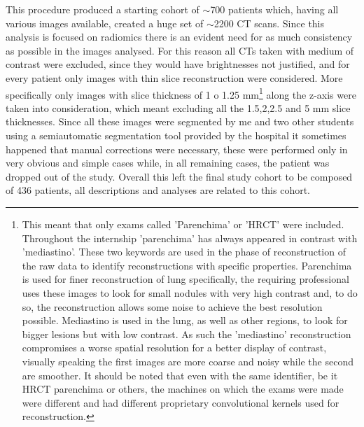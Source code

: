 This procedure produced a starting cohort of $\sim$700 patients which, having all various images available, created a huge set of $\sim$2200 CT scans. Since this analysis is focused on radiomics there is an evident need for as much consistency as possible in the images analysed. For this reason all CTs taken with medium of contrast were excluded, since they would have brightnesses not justified, and for every patient only images with thin slice reconstruction were considered. More specifically only images with slice thickness of 1 o 1.25 mm\footnote{This meant that only exams called 'Parenchima' or  'HRCT' were included. Throughout the internship 'parenchima' has always appeared in contrast with 'mediastino'. These two keywords are used in the phase of reconstruction of the raw data to identify reconstructions with specific properties. Parenchima is used for finer reconstruction of lung specifically, the requiring professional uses these images to look for small nodules with very high contrast and, to do so, the reconstruction allows some noise to achieve the best resolution possible. Mediastino is used in the lung, as well as other regions, to look for bigger lesions but with low contrast. As such the 'mediastino' reconstruction compromises a worse spatial resolution for a better display of contrast, visually speaking the first images are more coarse and noisy while the second are smoother. It should be noted that even with the same identifier, be it HRCT parenchima or others, the machines on which the exams were made were different and had different proprietary convolutional kernels used for reconstruction.} along the z-axis were taken into consideration, which meant excluding all the 1.5,2,2.5 and 5 mm slice thicknesses.
Since all these images were segmented by me and two other students using a semiautomatic segmentation tool provided by the hospital it sometimes happened that manual corrections were necessary, these were performed only in very obvious and simple cases while, in all remaining cases, the patient was dropped out of the study. 
Overall this left the final study cohort to be composed of 436 patients, all descriptions and analyses are related to this cohort.





























